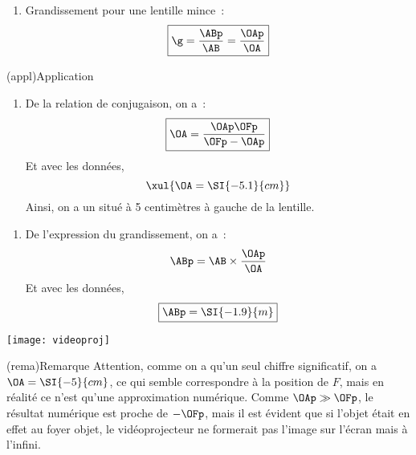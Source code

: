 \documentclass[../TDO3.tex]{subfiles}%
\begin{document}
{\begin{tcbraster}[raster columns=2, raster equal height=rows]
\begin{tcn}
\begin{enumerate}
				\item Grandissement pour une lentille mince~:
				      \[\boxed{\g = \frac{\ABp}{\AB} = \frac{\OAp}{\OA}}\]
			\end{enumerate}
		\end{tcn}
	\end{tcbraster}
	\begin{tcn}(appl){Application}
		\begin{enumerate}
			\item De la relation de conjugaison, on a~:
			      \[
              \boxed{\OA = \frac{\OAp\OFp}{\OFp-\OAp}}
            \]
            Et avec les données,
			      \[ \xul{\OA = \SI{-5.1}{cm}}\]
			      Ainsi, on a un  situé à 5 centimètres à gauche de
			      la lentille.
		\end{enumerate}
		\tcblower
		\begin{center}
			\begin{enumerate}[start=2]
				\item De l'expression du grandissement, on a~:
				      \[\ABp = \AB\times\frac{\OAp}{\OA}\]
				      Et avec les données,
				      \[ \boxed{\ABp = \SI{- 1.9}{m}} \]
			\end{enumerate}
			\texttt{[image: videoproj]}
		\end{center}
	\end{tcn}

	\begin{tcn}(rema){Remarque}
		Attention, comme on a qu'un seul chiffre significatif, on a $\OA =
			\SI{-5}{cm}$, ce qui semble correspondre à la position de $F$, mais en
		réalité ce n'est qu'une approximation numérique. Comme $\OAp \gg \OFp$, le
		résultat numérique est proche de $-\OFp$, mais il est évident que si l'objet
		était en effet au foyer objet, le vidéoprojecteur ne formerait pas l'image
		sur l'écran mais à l'infini.
	\end{tcn}
}
\end{document}
